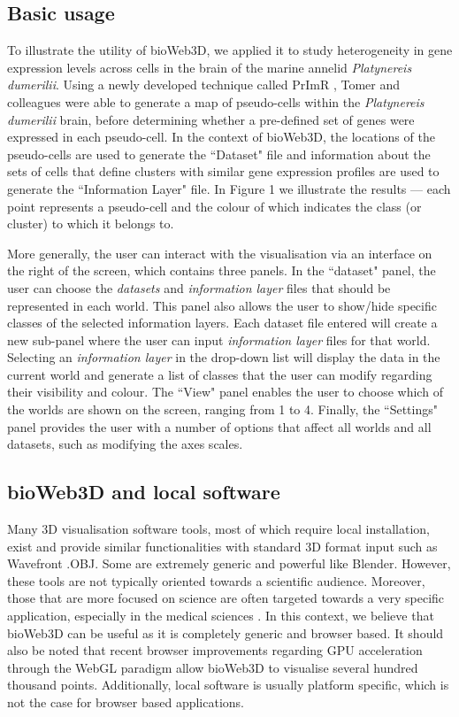 \documentclass[10pt]{bmc_article}
\newenvironment{bmcformat}{\baselineskip20pt\sloppy\setboolean{publ}{false}}{\baselineskip20pt\sloppy}
\begin{document}
\begin{bmcformat}
	\subsection{Basic usage}
	To illustrate the utility of bioWeb3D, we applied it to study heterogeneity in gene expression levels across cells in the brain of the marine annelid {\it{Platynereis dumerilii}}. Using a newly developed technique called PrImR \cite{Tomer10}, Tomer and colleagues were able to generate a map of pseudo-cells within the {\it{Platynereis dumerilii}} brain, before determining whether a pre-defined set of genes were expressed in each pseudo-cell. In the context of bioWeb3D, the locations of the pseudo-cells are used to generate the ``Dataset" file and information about the sets of cells that define clusters with similar gene expression profiles are used to generate the ``Information Layer" file. In Figure 1 we illustrate the results ---  each point represents a pseudo-cell and the colour of which indicates the class (or cluster) to which it belongs to. 
	
	More generally, the user can interact with the visualisation via an interface on the right of the screen, which contains three panels. In the ``dataset" panel, the user can choose the {\it{datasets}} and {\it{information layer}} files that should be represented in each world. This panel also allows the user to show/hide specific classes of the selected information layers. Each dataset file entered will create a new sub-panel where the user can input {\it{information layer}} files for that world. Selecting an {\it{information layer}} in the drop-down list will display the data in the current world and generate a list of classes that the user can modify regarding their visibility and colour. The ``View" panel enables the user to choose which of the worlds are shown on the screen, ranging from 1 to 4. Finally, the ``Settings" panel provides the user with a number of options that affect all worlds and all datasets, such as modifying the axes scales.

	\subsection{bioWeb3D and local software}
Many 3D visualisation software tools, most of which require local installation, exist and provide similar functionalities with standard 3D format input such as Wavefront .OBJ. Some are extremely generic and powerful like Blender. However, these tools are not typically oriented towards a scientific audience. Moreover, those that are more focused on science are often targeted towards a very specific application, especially in the medical sciences \cite{Wang09}. In this context, we believe that bioWeb3D can be useful as it is completely generic and browser based. It should also be noted that recent browser improvements regarding GPU acceleration through the WebGL paradigm allow bioWeb3D to visualise several hundred thousand points. Additionally, local software is usually platform specific, which is not the case for browser based applications.


\end{bmcformat}
\end{document}
